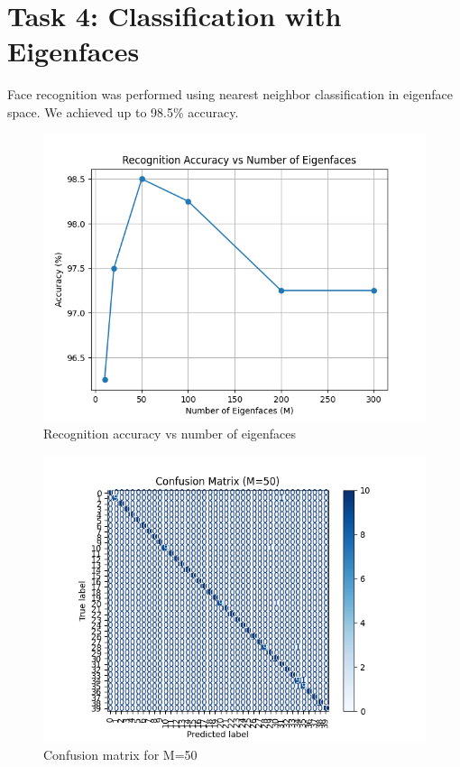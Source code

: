 \documentclass[conference]{IEEEtran}
\begin{document}
\section{Task 4: Classification with Eigenfaces}
Face recognition was performed using nearest neighbor classification in eigenface space. We achieved up to 98.5\% accuracy.

\begin{figure}[htbp]
\centering
\includegraphics[width=\linewidth]{recognition/accuracy_vs_eigenfaces.png}
\caption{Recognition accuracy vs number of eigenfaces}
\end{figure}

\begin{figure}[htbp]
\centering
\includegraphics[width=\linewidth]{recognition/confusion_matrix_M50.png}
\caption{Confusion matrix for M=50}
\end{figure}
\end{document}
